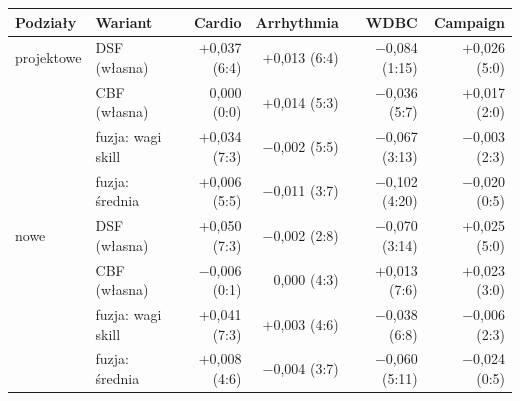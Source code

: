 \begin{tabular}{llrrrr}
\toprule
Podziały & Wariant & Cardio & Arrhythmia & WDBC & Campaign \\
\midrule
projektowe & DSF (własna) & +0,037 (6:4) & +0,013 (6:4) & $-$0,084 (1:15) & +0,026 (5:0) \\
 & CBF (własna) & 0,000 (0:0) & +0,014 (5:3) & $-$0,036 (5:7) & +0,017 (2:0) \\
 & fuzja: wagi skill & +0,034 (7:3) & $-$0,002 (5:5) & $-$0,067 (3:13) & $-$0,003 (2:3) \\
 & fuzja: średnia & +0,006 (5:5) & $-$0,011 (3:7) & $-$0,102 (4:20) & $-$0,020 (0:5) \\
nowe & DSF (własna) & +0,050 (7:3) & $-$0,002 (2:8) & $-$0,070 (3:14) & +0,025 (5:0) \\
 & CBF (własna) & $-$0,006 (0:1) & 0,000 (4:3) & +0,013 (7:6) & +0,023 (3:0) \\
 & fuzja: wagi skill & +0,041 (7:3) & +0,003 (4:6) & $-$0,038 (6:8) & $-$0,006 (2:3) \\
 & fuzja: średnia & +0,008 (4:6) & $-$0,004 (3:7) & $-$0,060 (5:11) & $-$0,024 (0:5) \\
\bottomrule
\end{tabular}
